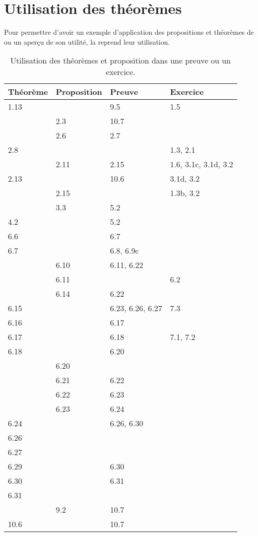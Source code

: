 \section{Utilisation des théorèmes}
Pour permettre d'avoir un exemple d'application des propositions et théorèmes de \cite{willem2008principes}
ou un aperçu de son utilité, la  reprend leur utilisation.
\begin{table}
  \centering
  \begin{tabular}{|l|l||l|l|}
    \hline
    Théorème & Proposition & Preuve & Exercice\\
    \hline
    1.13 &      & 9.5  & 1.5\\
    \hline
         & 2.3  & 10.7 &\\
    \hline
         & 2.6  & 2.7  &\\
    \hline
    2.8  &      &      & 1.3, 2.1\\
    \hline
         & 2.11 & 2.15 & 1.6, 3.1c, 3.1d, 3.2\\
    \hline
    2.13 &      & 10.6 & 3.1d, 3.2\\
    \hline
         & 2.15 &      & 1.3b, 3.2\\
    \hline
         & 3.3  & 5.2  &\\
    \hline
    4.2  &      & 5.2  &\\
    \hline
    6.6  &      & 6.7  &\\
    \hline
    6.7  &      & 6.8, 6.9c  &\\
    \hline
         & 6.10 & 6.11, 6.22 &\\
    \hline
         & 6.11 &      & 6.2\\
    \hline
         & 6.14 & 6.22 &\\
    \hline
    6.15 &      & 6.23, 6.26, 6.27 & 7.3\\ %
    \hline
    6.16 &      & 6.17 &\\
    \hline
    6.17 &      & 6.18 & 7.1, 7.2\\
    \hline
    6.18 &      & 6.20 &\\
    \hline
         & 6.20 &      &\\
    \hline
         & 6.21 & 6.22 &\\
    \hline
         & 6.22 & 6.23 &\\
    \hline
         & 6.23 & 6.24 &\\
    \hline
    6.24 &      & 6.26, 6.30 &\\
    \hline
    6.26 &      &      &\\
    \hline
    6.27 &      &      &\\
    \hline
    6.29 &      & 6.30 &\\
    \hline
    6.30 &      & 6.31 &\\
    \hline
    6.31 &      &      &\\
    \hline
         & 9.2  & 10.7 &\\
    \hline
    10.6 &      & 10.7 &\\
    \hline
  \end{tabular}
  \caption{Utilisation des théorèmes et proposition dans une preuve ou un exercice.}
  \label{tab:use}
\end{table}

\biblio



